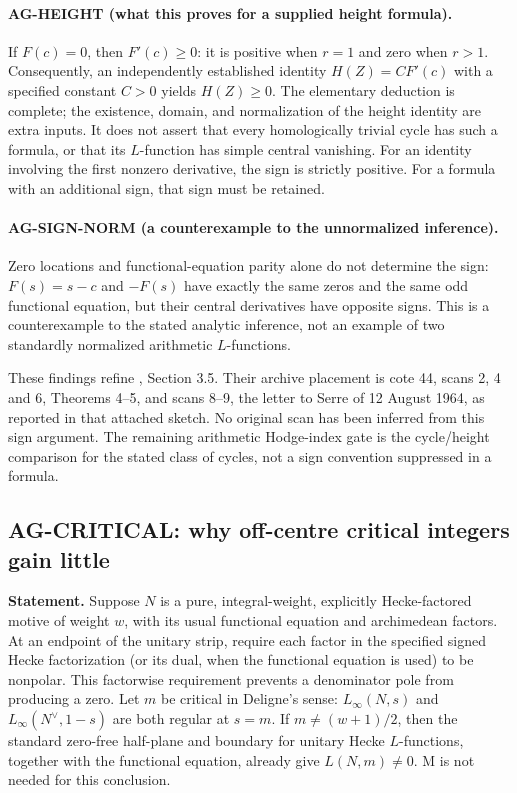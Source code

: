 \documentclass[11pt,a4paper]{article}
\begin{document}
\paragraph{AG-HEIGHT (what this proves for a supplied height formula).}
If $F(c)=0$, then $F'(c)\ge0$: it is positive when $r=1$ and zero when
$r>1$. Consequently, an independently established identity
$H(Z)=C F'(c)$ with a specified constant $C>0$ yields $H(Z)\ge0$.
The elementary deduction is complete; the existence, domain, and
normalization of the height identity are extra inputs. It does not assert
that every homologically trivial cycle has such a formula, or that its
$L$-function has simple central vanishing. For an identity involving the
first nonzero derivative, the sign is strictly positive. For a formula with
an additional sign, that sign must be retained.

\paragraph{AG-SIGN-NORM (a counterexample to the unnormalized inference).}
Zero locations and functional-equation parity alone do not determine the
sign: $F(s)=s-c$ and $-F(s)$ have exactly the same zeros and the same odd
functional equation, but their central derivatives have opposite signs.
This is a counterexample to the stated analytic inference, not an example
of two standardly normalized arithmetic $L$-functions.

These findings refine ,
Section 3.5. Their archive placement is cote 44, scans 2, 4 and 6,
Theorems 4--5, and scans 8--9, the letter to Serre of 12 August 1964,
as reported in that attached sketch. No original scan has been inferred
from this sign argument. The remaining arithmetic Hodge-index gate is
the cycle/height comparison for the stated class of cycles, not a sign
convention suppressed in a formula.

\subsection{AG-CRITICAL: why off-centre critical integers gain little}
\label{ag:critical}

\textbf{Statement.} Suppose $N$ is a pure, integral-weight, explicitly
Hecke-factored motive of weight $w$, with its usual functional equation
and archimedean factors. At an endpoint of the unitary strip, require each
factor in the specified signed Hecke factorization (or its dual, when the
functional equation is used) to be nonpolar. This factorwise requirement
prevents a denominator pole from producing a zero. Let $m$ be critical in
Deligne's sense: $L_\infty(N,s)$ and $L_\infty(N^\vee,1-s)$
are both regular at $s=m$. If $m\ne(w+1)/2$, then the standard
zero-free half-plane and boundary for unitary Hecke $L$-functions,
together with the functional equation, already give $L(N,m)\ne0$.
M is not needed for this conclusion.
\end{document}
